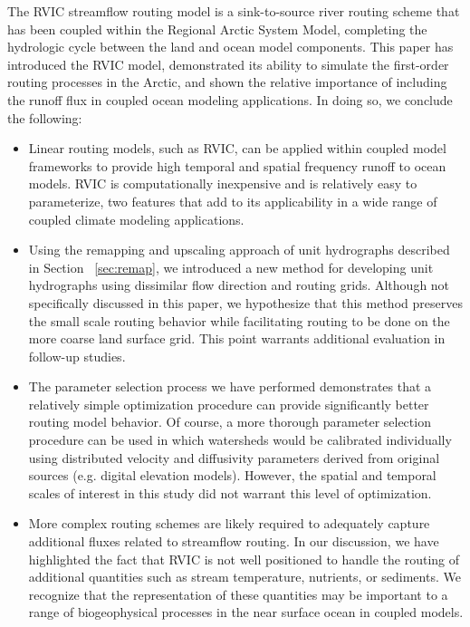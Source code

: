 \documentclass[jgrga, draft]{agutex}
\begin{document}
\begin{article}
The RVIC streamflow routing model is a sink-to-source river routing scheme that has been coupled within the Regional Arctic System Model, completing the hydrologic cycle between the land and ocean model components.
This paper has introduced the RVIC model, demonstrated its ability to simulate the first-order routing processes in the Arctic, and shown the relative importance of including the runoff flux in coupled ocean modeling applications.
In doing so, we conclude the following:

\begin{itemize}
\item Linear routing models, such as RVIC, can be applied within coupled model frameworks to provide high temporal and spatial frequency runoff to ocean models.
RVIC is computationally inexpensive and is relatively easy to parameterize, two features that add to its applicability in a wide range of coupled climate modeling applications.
\item Using the remapping and upscaling approach of unit hydrographs described in Section ~\ref{sec:remap}, we introduced a new method for developing unit hydrographs using dissimilar flow direction and routing grids.
Although not specifically discussed in this paper, we hypothesize that this method preserves the small scale routing behavior while facilitating routing to be done on the more coarse land surface grid. %
This point warrants additional evaluation in follow-up studies.
\item The parameter selection process we have performed demonstrates that a relatively simple optimization procedure can provide significantly better routing model behavior.
Of course, a more thorough parameter selection procedure can be used in which  watersheds would be calibrated individually using distributed velocity and diffusivity parameters derived from original sources (e.g. digital elevation models).
However, the spatial and temporal scales of interest in this study did not warrant this level of optimization.
\item More complex routing schemes are likely required to adequately capture additional fluxes related to streamflow routing.
In our discussion, we have highlighted the fact that RVIC is not well positioned to handle the routing of additional quantities such as stream temperature, nutrients, or sediments.
We recognize that the representation of these quantities may be important to a range of biogeophysical processes in the near surface ocean in coupled models.

\end{itemize}
\end{article}
\end{document}

